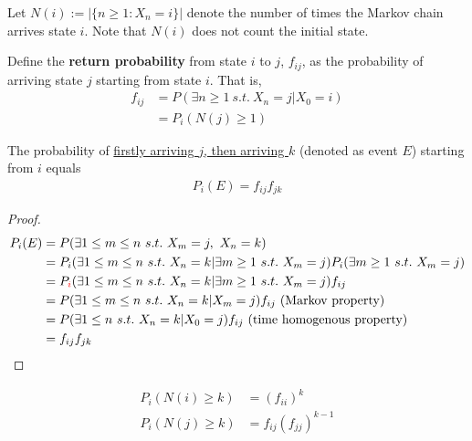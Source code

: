 \documentclass{article}
\begin{document}
    \begin{notation}
    	Let $N(i) := |\{n \geq 1: X_n = i\}|$ denote the number of times the Markov chain arrives state $i$. Note that $N(i)$ does not count the initial state.
    \end{notation}
    
    \begin{definition}
    	Define the \textbf{return probability} from state $i$ to $j$, $f_{ij}$, as the probability of arriving state $j$ starting from state $i$. That is,
    	\begin{align}
    		f_{ij} &= P(\exists n \geq 1\ s.t.\ X_n = j | X_0 = i) \\
    		&= P_i(N(j) \geq 1)
    	\end{align}
    \end{definition}
    
    \begin{proposition}
    	The probability of \ul{firstly arriving $j$, then arriving $k$} (denoted as event $E$) starting from $i$ equals
    	\begin{align}
    		P_i(E) = f_{ij} f_{jk}
    	\end{align}
    \end{proposition}
    
    \begin{proof}
    	\begin{align}
    		P_i(E) &= P(\exists 1 \leq m \leq n \ s.t.\ X_m=j,\ X_n = k) \\
    		&= P_i(\exists 1 \leq m \leq n \ s.t.\ X_n = k|\exists m \geq 1\ s.t.\ X_m=j) P_i(\exists m \geq 1\ s.t.\ X_m=j) \\
    		&= P_{\textcolor{red}{i}}(\exists 1 \leq m \leq n \ s.t.\ X_n = k|\exists m \geq 1\ s.t.\ X_m=j) f_{ij} \\
    		&= P(\exists 1 \leq m \leq n \ s.t.\ X_n = k|X_m=j) f_{ij} \text{{ (Markov property)}} \\
    		&= P(\exists 1 \leq n \ s.t.\ X_n = k|X_0=j) f_{ij} \text{{ (time homogenous property)}} \\
    		&= f_{ij}f_{jk}
    	\end{align}
    \end{proof}
    
    \begin{corollary}
    	\begin{align}
    		P_i(N(i) \geq k) &= (f_{ii})^k \\
    		P_i(N(j) \geq k) &= f_{ij}(f_{jj})^{k-1}
    	\end{align}
    \end{corollary}
\end{document}
